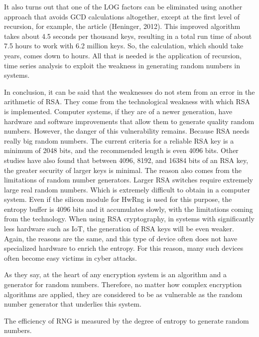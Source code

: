\documentclass[graybox]{svmult}
\begin{document}
It also turns out that one of the LOG factors can be eliminated using another approach that avoids GCD calculations altogether, except at the first level of recursion, for example, the article (Heninger, 2012). This improved algorithm takes about 4.5 seconds per thousand keys, resulting in a total run time of about 7.5 hours to work with 6.2 million keys. So, the calculation, which should take years, comes down to hours. All that is needed is the application of recursion, time series analysis to exploit the weakness in generating random numbers in systems.

In conclusion, it can be said that the weaknesses do not stem from an error in the arithmetic of RSA. They come from the technological weakness with which RSA is implemented. Computer systems, if they are of a newer generation, have hardware and software improvements that allow them to generate quality random numbers. However, the danger of this vulnerability remains. Because RSA needs really big random numbers. The current criteria for a reliable RSA key is a minimum of 2048 bits, and the recommended length is even 4096 bits. Other studies have also found that between 4096, 8192, and 16384 bits of an RSA key, the greater security of larger keys is minimal. The reason also comes from the limitations of random number generators. Larger RSA switches require extremely large real random numbers. Which is extremely difficult to obtain in a computer system. Even if the silicon module for HwRng is used for this purpose, the entropy buffer is 4096 bits and it accumulates slowly, with the limitations coming from the technology. When using RSA cryptography, in systems with significantly less hardware such as IoT, the generation of RSA keys will be even weaker. Again, the reasons are the same, and this type of device often does not have specialized hardware to enrich the entropy. For this reason, many such devices often become easy victims in cyber attacks.

As they say, at the heart of any encryption system is an algorithm and a generator for random numbers. Therefore, no matter how complex encryption algorithms are applied, they are considered to be as vulnerable as the random number generator that underlies this system.

The efficiency of RNG is measured by the degree of entropy to generate random numbers.
\end{document}
